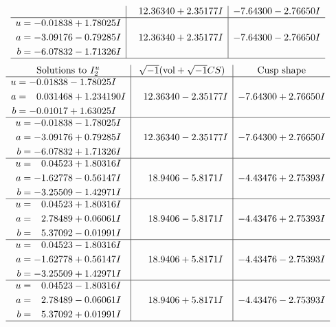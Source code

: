 \documentclass[1p]{elsarticle_modified}
\theoremstyle{definition}
\newcommand{\I}{\sqrt{-1}}
\begin{document}
$$\begin{array}{c|c|c}
 & \phantom{-}12.36340 + 2.35177 I & -7.64300 - 2.76650 I \\ \hline\begin{aligned}
u &= -0.01838 + 1.78025 I \\
a &= -3.09176 - 0.79285 I \\
b &= -6.07832 - 1.71326 I\end{aligned}
 & \phantom{-}12.36340 + 2.35177 I & -7.64300 - 2.76650 I\\
 \hline 
 \end{array}$$\newpage$$\begin{array}{c|c|c}  
\text{Solutions to }I^u_{2}& \I (\text{vol} + \sqrt{-1}CS) & \text{Cusp shape}\\
 \hline 
\begin{aligned}
u &= -0.01838 - 1.78025 I \\
a &= \phantom{-}0.031468 + 1.234190 I \\
b &= -0.01017 + 1.63025 I\end{aligned}
 & \phantom{-}12.36340 - 2.35177 I & -7.64300 + 2.76650 I \\ \hline\begin{aligned}
u &= -0.01838 - 1.78025 I \\
a &= -3.09176 + 0.79285 I \\
b &= -6.07832 + 1.71326 I\end{aligned}
 & \phantom{-}12.36340 - 2.35177 I & -7.64300 + 2.76650 I \\ \hline\begin{aligned}
u &= \phantom{-}0.04523 + 1.80316 I \\
a &= -1.62778 - 0.56147 I \\
b &= -3.25509 - 1.42971 I\end{aligned}
 & \phantom{-}18.9406 - 5.8171 I & -4.43476 + 2.75393 I \\ \hline\begin{aligned}
u &= \phantom{-}0.04523 + 1.80316 I \\
a &= \phantom{-}2.78489 + 0.06061 I \\
b &= \phantom{-}5.37092 - 0.01991 I\end{aligned}
 & \phantom{-}18.9406 - 5.8171 I & -4.43476 + 2.75393 I \\ \hline\begin{aligned}
u &= \phantom{-}0.04523 - 1.80316 I \\
a &= -1.62778 + 0.56147 I \\
b &= -3.25509 + 1.42971 I\end{aligned}
 & \phantom{-}18.9406 + 5.8171 I & -4.43476 - 2.75393 I \\ \hline\begin{aligned}
u &= \phantom{-}0.04523 - 1.80316 I \\
a &= \phantom{-}2.78489 - 0.06061 I \\
b &= \phantom{-}5.37092 + 0.01991 I\end{aligned}
 & \phantom{-}18.9406 + 5.8171 I & -4.43476 - 2.75393 I\\
 \hline 
 \end{array}$$\newpage\newpage\renewcommand{\arraystretch}{1}
\end{document}
